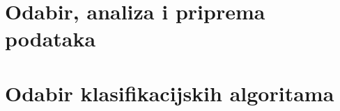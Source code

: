\documentclass[12pt,a4paper]{article}
\begin{document}
\hypersetup{pageanchor=false}

\clearpage
\hypersetup{pageanchor=true}
\tableofcontents
\clearpage
{}

\section{Odabir, analiza i priprema podataka}





\clearpage
\section{Odabir klasifikacijskih algoritama}


\clearpage
{}
{}


\end{document}
